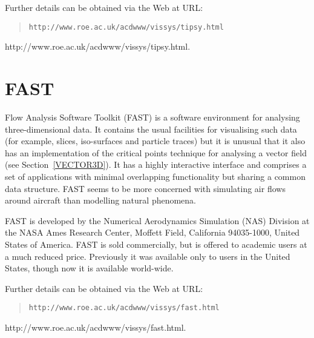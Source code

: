 \begin{latex}
Further details can be obtained via the Web at URL:

\begin{quote}
{\tt http://www.roe.ac.uk/acdwww/vissys/tipsy.html}
\end{quote}
\end{latex}

\begin{htmlonly}
{http://www.roe.ac.uk/acdwww/vissys/tipsy.html}.
\end{htmlonly}


\section{FAST \label{FAST}  }

Flow Analysis Software Toolkit (FAST) is a software environment for
analysing three-dimensional data. It contains the usual facilities for
visualising such data (for example, slices, iso-surfaces and particle
traces) but it is unusual that it also has an implementation of the
critical points technique for analysing a vector field (see
Section~\ref{VECTOR3D}). It has a highly interactive interface and
comprises a set of applications with minimal overlapping functionality
but sharing a common data structure. FAST seems to be more concerned
with simulating air flows around aircraft than modelling natural
phenomena.

FAST is developed by the Numerical Aerodynamics Simulation (NAS)
Division at the NASA Ames Research Center, Moffett Field, California
94035-1000, United States of America. FAST is sold commercially, but is
offered to academic users at a much reduced price. Previously it was
available only to users in the United States, though now it is available
world-wide.

\begin{latex}
Further details can be obtained via the Web at URL:

\begin{quote}
{\tt http://www.roe.ac.uk/acdwww/vissys/fast.html}
\end{quote}
\end{latex}

\begin{htmlonly}
{http://www.roe.ac.uk/acdwww/vissys/fast.html}.
\end{htmlonly}



